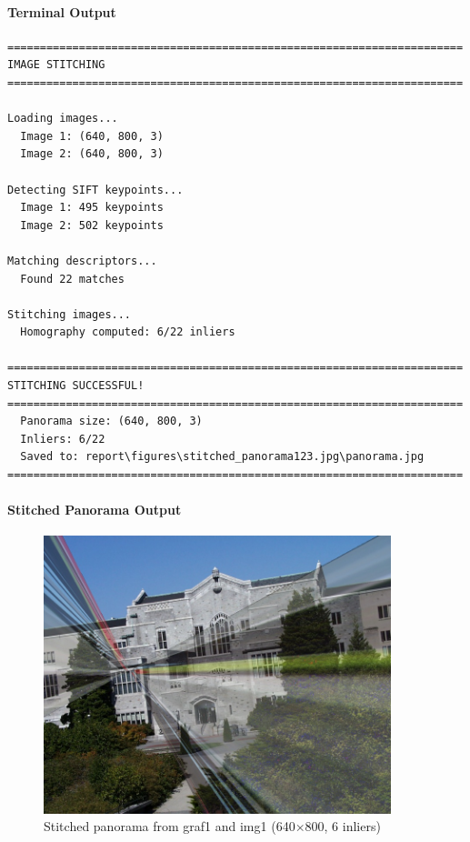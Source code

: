 \documentclass[12pt,a4paper]{article}
\begin{document}
\paragraph{Terminal Output}
\begin{lstlisting}
======================================================================
IMAGE STITCHING
======================================================================

Loading images...
  Image 1: (640, 800, 3)
  Image 2: (640, 800, 3)

Detecting SIFT keypoints...
  Image 1: 495 keypoints
  Image 2: 502 keypoints

Matching descriptors...
  Found 22 matches

Stitching images...
  Homography computed: 6/22 inliers

======================================================================
STITCHING SUCCESSFUL!
======================================================================
  Panorama size: (640, 800, 3)
  Inliers: 6/22
  Saved to: report\figures\stitched_panorama123.jpg\panorama.jpg
======================================================================
\end{lstlisting}

\paragraph{Stitched Panorama Output}

\begin{figure}[H]
\centering
\includegraphics[width=0.9\textwidth]{report/figures/stitched_panorama123.jpg/panorama.jpg}
\caption{Stitched panorama from graf1 and img1 (640×800, 6 inliers)}
\end{figure}
\end{document}
